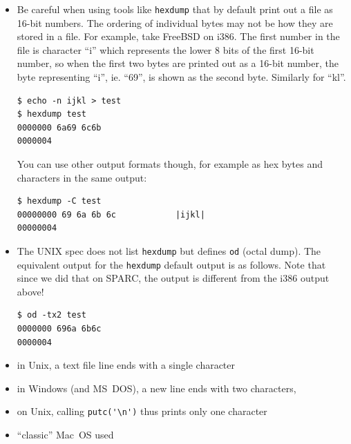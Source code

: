 \begin{itemize}
\item Be careful when using tools like \texttt{hexdump} that by default print
out a file as 16-bit numbers.  The ordering of individual bytes may not be how
they are stored in a file.  For example, take FreeBSD on i386.  The first number
in the file is character ``i'' which represents the lower 8 bits of the first 16-bit
number, so when the first two bytes are printed out as a 16-bit number, the byte
representing ``i'', ie. ``69'', is shown as the second byte.  Similarly for
``kl''.

\begin{verbatim}
$ echo -n ijkl > test
$ hexdump test
0000000 6a69 6c6b
0000004
\end{verbatim}

You can use other output formats though, for example as hex bytes and
characters in the same output:

\begin{verbatim}
$ hexdump -C test 
00000000 69 6a 6b 6c            |ijkl|
00000004
\end{verbatim}

\item The UNIX spec does not list \texttt{hexdump} but defines \texttt{od}
(octal dump).  The equivalent output for the \texttt{hexdump} default output is
as follows.  Note that since we did that on SPARC, the output is different from
the i386 output above!

\begin{verbatim}
$ od -tx2 test
0000000 696a 6b6c
0000004
\end{verbatim}
\end{itemize}


\begin{slide}
\begin{itemize}
\item in Unix, a text file line ends with a single character 
\item in Windows (and MS~DOS), a new line ends with two characters, 
\item on Unix, calling \verb.putc('\n'). thus prints only one character
\item ``classic'' Mac~OS used 
\end{itemize}
\end{slide}

\label{NEWLINECHAR}


